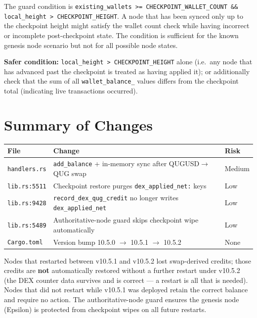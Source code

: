 \documentclass[11pt,a4paper]{article}
\begin{document}
\begin{infobox}
The guard condition is \texttt{existing\_wallets >= CHECKPOINT\_WALLET\_COUNT \&\& local\_height > CHECKPOINT\_HEIGHT}.  A node that has been synced only up to the
checkpoint height might satisfy the wallet count check while having incorrect or
incomplete post-checkpoint state.  The condition is sufficient for the known
genesis node scenario but not for all possible node states.

\textbf{Safer condition:} \texttt{local\_height > CHECKPOINT\_HEIGHT} alone
(i.e.\ any node that has advanced past the checkpoint is treated as having
applied it); or additionally check that the sum of all \texttt{wallet\_balance\_}
values differs from the checkpoint total (indicating live transactions occurred).
\end{infobox}

\section{Summary of Changes}

\begin{center}
\begin{tabularx}{\textwidth}{lXl}
\toprule
\textbf{File} & \textbf{Change} & \textbf{Risk} \\
\midrule
\texttt{handlers.rs} &
  \texttt{add\_balance} + in-memory sync after QUGUSD$\to$QUG swap &
  Medium \\
\texttt{lib.rs:5511} &
  Checkpoint restore purges \texttt{dex\_applied\_net:} keys &
  Low \\
\texttt{lib.rs:9428} &
  \texttt{record\_dex\_qug\_credit} no longer writes \texttt{dex\_applied\_net} &
  Low \\
\texttt{lib.rs:5489} &
  Authoritative-node guard skips checkpoint wipe automatically &
  Low \\
\texttt{Cargo.toml} &
  Version bump 10.5.0 $\to$ 10.5.1 $\to$ 10.5.2 &
  None \\
\bottomrule
\end{tabularx}
\end{center}

\bigskip

\begin{fixbox}
Nodes that restarted between v10.5.1 and v10.5.2 lost swap-derived credits;
those credits are \textbf{not} automatically restored without a further restart
under v10.5.2 (the DEX counter data survives and is correct — a restart is all
that is needed).  Nodes that did not restart while v10.5.1 was deployed retain
the correct balance and require no action.  The authoritative-node guard ensures
the genesis node (Epsilon) is protected from checkpoint wipes on all future
restarts.
\end{fixbox}
\end{document}
